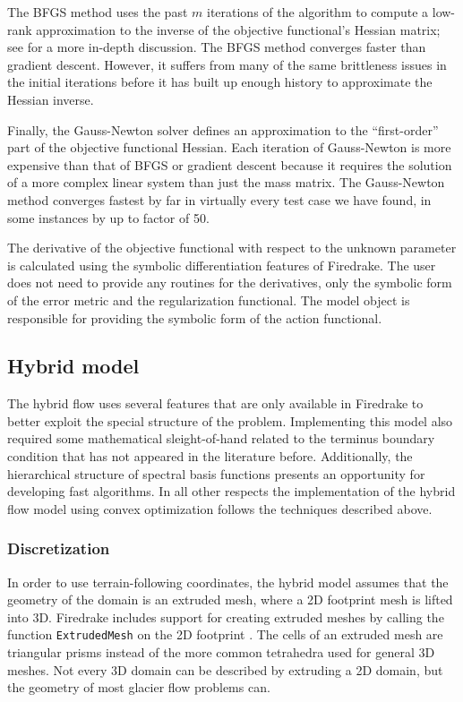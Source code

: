 \documentclass{article}
\theoremstyle{definition}
\theoremstyle{plain}
\begin{document}
The BFGS method uses the past $m$ iterations of the algorithm to compute a low-rank approximation to the inverse of the objective functional's Hessian matrix; see \citet{nocedal2006numerical} for a more in-depth discussion.
The BFGS method converges faster than gradient descent.
However, it suffers from many of the same brittleness issues in the initial iterations before it has built up enough history to approximate the Hessian inverse.

Finally, the Gauss-Newton solver defines an approximation to the ``first-order'' part of the objective functional Hessian.
Each iteration of Gauss-Newton is more expensive than that of BFGS or gradient descent because it requires the solution of a more complex linear system than just the mass matrix.
The Gauss-Newton method converges fastest by far in virtually every test case we have found, in some instances by up to factor of 50.

The derivative of the objective functional with respect to the unknown parameter is calculated using the symbolic differentiation features of Firedrake.
The user does not need to provide any routines for the derivatives, only the symbolic form of the error metric and the regularization functional.
The model object is responsible for providing the symbolic form of the action functional.


\subsection{Hybrid model}

The hybrid flow uses several features that are only available in Firedrake to better exploit the special structure of the problem.
Implementing this model also required some mathematical sleight-of-hand related to the terminus boundary condition that has not appeared in the literature before.
Additionally, the hierarchical structure of spectral basis functions presents an opportunity for developing fast algorithms.
In all other respects the implementation of the hybrid flow model using convex optimization follows the techniques described above.

\subsubsection{Discretization}

In order to use terrain-following coordinates, the hybrid model assumes that the geometry of the domain is an extruded mesh, where a 2D footprint mesh is lifted into 3D.
Firedrake includes support for creating extruded meshes by calling the function \texttt{ExtrudedMesh} on the 2D footprint \citep{bercea2016structure}.
The cells of an extruded mesh are triangular prisms instead of the more common tetrahedra used for general 3D meshes.
Not every 3D domain can be described by extruding a 2D domain, but the geometry of most glacier flow problems can.
\end{document}
